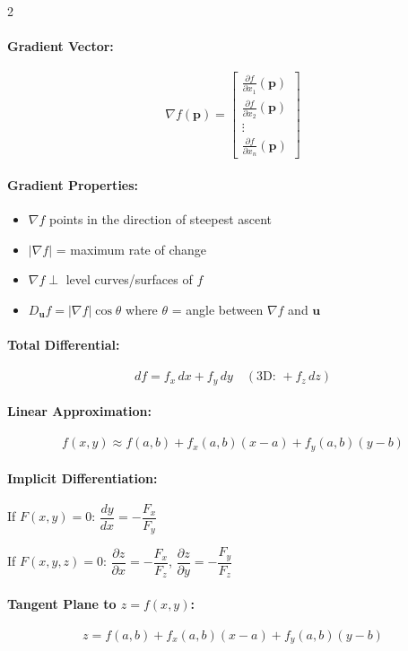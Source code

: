 \begin{multicols}{2}
\paragraph{Gradient Vector:}
\[
\nabla f(\mathbf{p}) = \begin{bmatrix} 
\frac{\partial f}{\partial x_1}(\mathbf{p}) \\[1em] 
\frac{\partial f}{\partial x_2}(\mathbf{p}) \\[1em] 
\vdots \\[1em] 
\frac{\partial f}{\partial x_n}(\mathbf{p}) 
\end{bmatrix}
\]
\paragraph{Gradient Properties:}
\begin{itemize}
\item $\nabla f$ points in the direction of steepest ascent
\item $|\nabla f|$ = maximum rate of change
\item $\nabla f \perp$ level curves/surfaces of $f$
\item $D_{\mathbf{u}}f = |\nabla f|\cos\theta$ where $\theta$ = angle between $\nabla f$ and $\mathbf{u}$
\end{itemize}

\paragraph{Total Differential:}
\[
df = f_x \, dx + f_y \, dy \quad(\text{3D: } + f_z\,dz)
\]

\paragraph{Linear Approximation:}
\[
f(x,y) \approx f(a,b) + f_x(a,b)(x-a) + f_y(a,b)(y-b)
\]

\paragraph{Implicit Differentiation:}
If \(F(x,y) = 0\): $\dfrac{dy}{dx} = -\dfrac{F_x}{F_y}$

\medskip
If \(F(x,y,z) = 0\): $\dfrac{\partial z}{\partial x} = -\dfrac{F_x}{F_z}$, \;\; $\dfrac{\partial z}{\partial y} = -\dfrac{F_y}{F_z}$

\paragraph{Tangent Plane to $z = f(x,y)$:}
\[
z = f(a,b) + f_x(a,b)(x - a) + f_y(a,b)(y - b)
\]


\end{multicols}
